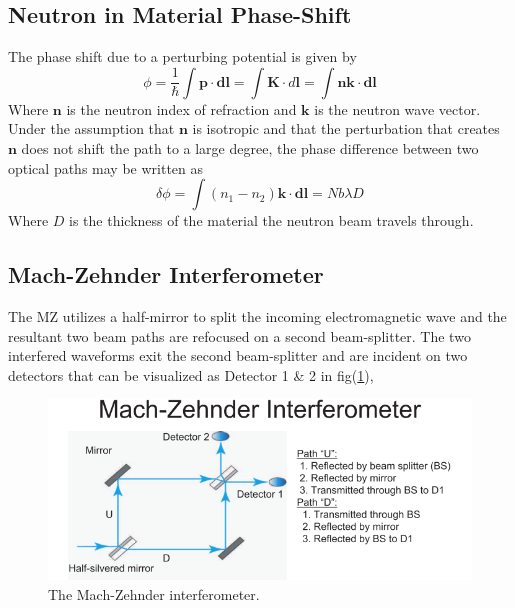 \subsection{Neutron in Material Phase-Shift}
The phase shift due to a perturbing potential is given by \cite{green_2}
\begin{equation}
\phi = \frac{1}{\hbar}\int  \mathbf{p}\cdot \mathbf{dl} = \int \mathbf{K}\cdot d\mathbf{l}= \int \mathbf{nk}\cdot \mathbf{dl}
\label{eq:phase_shift}
\end{equation}
Where $\mathbf{n}$ is the neutron index of refraction and $\mathbf{k}$ is the neutron wave vector. Under the assumption that $\mathbf{n}$ is isotropic and that the perturbation that creates $\mathbf{n}$ does not shift the path to a large degree, the phase difference between two optical paths may be written as
\begin{equation}
\delta\phi = \int (n_1-n_2)\mathbf{k}\cdot \mathbf{dl} = Nb\lambda D
\label{eq:phase_shift_full}
\end{equation}
Where $D$ is the thickness of the material the neutron beam travels through.  

\subsection{Mach-Zehnder Interferometer}

The MZ utilizes a half-mirror to split the incoming electromagnetic wave and the resultant two beam paths are refocused on a second beam-splitter. The two interfered waveforms exit the second beam-splitter and are incident on two detectors that can be visualized as Detector 1 \& 2 in fig(\ref{mach-zehnder}),

\begin{figure}[ht!]
\centering
\includegraphics[scale=0.65]{Figures/mach-zender.png}
\caption{The Mach-Zehnder interferometer. \cite{dimaThesis}}
\label{mach-zehnder}
\end{figure}

